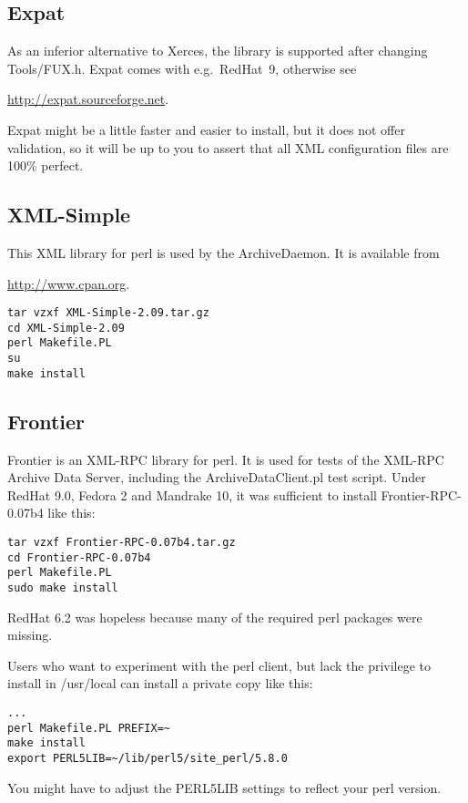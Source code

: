 
\subsection{Expat}
As an inferior alternative to Xerces, the  library is supported
after changing Tools/FUX.h. Expat comes with e.g.\ RedHat~9,
otherwise see
\begin{center}
\href{http://expat.sourceforge.net}{http://expat.sourceforge.net}.
\end{center}
Expat might be a little faster and easier to install, but it does not
offer validation, so it will be up to you to assert that all XML
configuration files are 100\% perfect.

\subsection{XML-Simple}
This XML library for perl is used by the ArchiveDaemon.
It is available from 
\begin{center}
\href{http://www.cpan.org}{http://www.cpan.org}.
\end{center}
\begin{lstlisting}[keywordstyle=\sffamily]
tar vzxf XML-Simple-2.09.tar.gz
cd XML-Simple-2.09
perl Makefile.PL
su
make install
\end{lstlisting}

\subsection{Frontier}
Frontier is an XML-RPC library for perl.
It is used for tests of the XML-RPC Archive Data Server,
including the ArchiveDataClient.pl test script.
Under RedHat 9.0, Fedora 2 and Mandrake 10, it was sufficient to install
Frontier-RPC-0.07b4 like this:
\begin{lstlisting}[keywordstyle=\sffamily]
tar vzxf Frontier-RPC-0.07b4.tar.gz
cd Frontier-RPC-0.07b4
perl Makefile.PL
sudo make install
\end{lstlisting}

\noindent RedHat 6.2 was hopeless because many of the required perl
packages were missing.

Users who want to experiment with the perl client, but lack the
privilege to install in /usr/local can install a private copy like
this:
\begin{lstlisting}[keywordstyle=\sffamily]
...
perl Makefile.PL PREFIX=~
make install
export PERL5LIB=~/lib/perl5/site_perl/5.8.0
\end{lstlisting}
\noindent You might have to adjust the PERL5LIB settings to reflect
your perl version.

